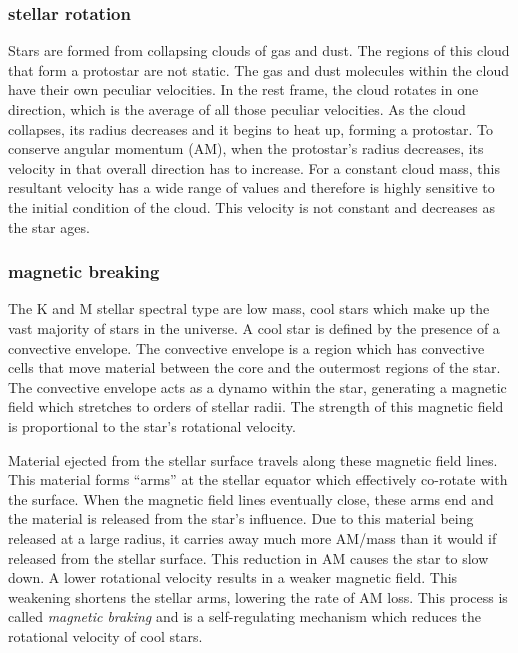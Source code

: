 \documentclass[fleqn,usenatbib]{mnras}
\begin{document}

\subsubsection{stellar rotation }
Stars are formed from collapsing clouds of gas and dust. 
The regions of this cloud that form a protostar are not static.
The gas and dust molecules within the cloud have their own peculiar velocities.
In the rest frame, the cloud rotates in one direction, which is the average of all those peculiar velocities.
As the cloud collapses, its radius decreases and it begins to heat up, forming a protostar. 
To conserve angular momentum (AM), when the protostar’s radius decreases, its velocity in that overall direction has to increase.
For a constant cloud mass, this resultant velocity has a wide range of values and therefore is highly sensitive to the initial condition of the cloud. 
This velocity is not constant and decreases as the star ages.


\subsubsection{magnetic breaking}
The K and M stellar spectral type are low mass, cool stars which make up the vast majority of stars in the universe. 
A cool star is defined by the presence of a convective envelope.
The convective envelope is a region which has convective cells that move material between the core and the outermost regions of the star. 
The convective envelope acts as a dynamo within the star, generating a magnetic field which stretches to orders of stellar radii. 
The strength of this magnetic field is proportional to the star's rotational velocity.

Material ejected from the stellar surface travels along these magnetic field lines.
This material forms “arms” at the stellar equator which effectively co-rotate with the surface.
When the magnetic field lines eventually close, these arms end and the material is released from the star’s influence.
Due to this material being released at a large radius, it carries away much more AM/mass than it would if released from the stellar surface.
This reduction in AM causes the star to slow down. 
A lower rotational velocity results in a weaker magnetic field.
This weakening shortens the stellar arms, lowering the rate of AM loss.
This process is called \textit{magnetic braking} and is a self-regulating mechanism which reduces the rotational velocity of cool stars. 
\end{document}
